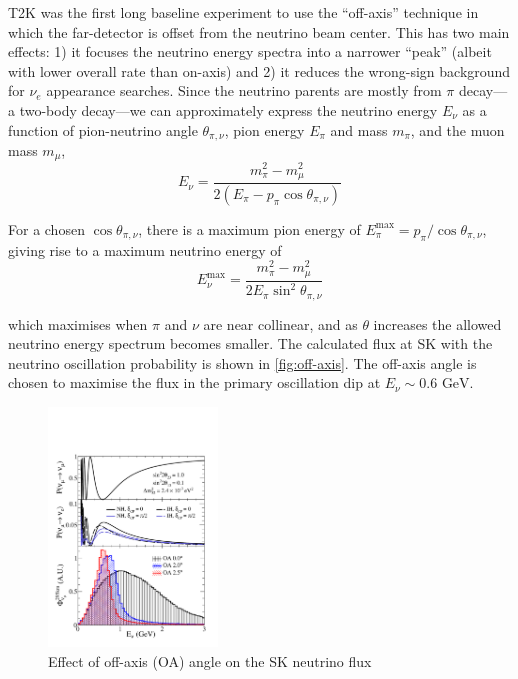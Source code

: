 T2K was the first long baseline experiment to use the ``off-axis'' technique\cite{off_axis} in which the far-detector is offset from the neutrino beam center. This has two main effects: 1) it focuses the neutrino energy spectra into a narrower ``peak'' (albeit with lower overall rate than on-axis) and 2) it reduces the wrong-sign background for $\nu_e$ appearance searches. Since the neutrino parents are mostly from $\pi$ decay---a two-body decay---we can approximately express the neutrino energy $E_\nu$ as a function of pion-neutrino angle $\theta_{\pi,\nu}$, pion energy $E_\pi$ and mass $m_\pi$, and the muon mass $m_\mu$,
\begin{equation}
	E_\nu = \frac{m^2_\pi-m^2_\mu}{2\left( E_\pi - p_\pi \cos \theta_{\pi,\nu} \right)} 
\end{equation}

For a chosen $\cos \theta_{\pi,\nu}$, there is a maximum pion energy of $E_\pi^\text{max} = p_\pi/\cos\theta_{\pi,\nu}$, giving rise to a maximum neutrino energy of
\begin{equation}
	E_\nu^\text{max} = \frac{m^2_\pi-m^2_\mu}{2E_\pi \sin^2 \theta_{\pi,\nu}} 
\end{equation}

which maximises when $\pi$ and $\nu$ are near collinear, and as $\theta$ increases the allowed neutrino energy spectrum becomes smaller. The calculated flux at SK with the neutrino oscillation probability is shown in \autoref{fig:off-axis}. The off-axis angle is chosen to maximise the flux in the primary oscillation dip at $E_\nu \sim 0.6\text{ GeV}$.
\begin{figure}[h]
	\includegraphics[width=0.4\textwidth, trim={0mm 0mm 0mm 0mm}, clip,page=1]{figures/det_chap/oaeffect_pnue_pnumu_flux}
	\caption{Effect of off-axis (OA) angle on the SK neutrino flux}
	\label{fig:off-axis}
\end{figure}

